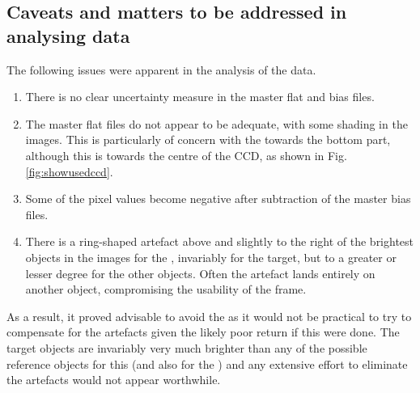 \clearpage

\subsection{Caveats and matters to be addressed in analysing data}
\protect\label{section:mattersaddressed}

The following issues were apparent in the analysis of the data.

\begin{enumerate}
  \item There is no clear uncertainty measure in the master flat and bias files.
  \item The master flat files do not appear to be adequate, with some shading in
  	the images. This is particularly of concern with the {\gfilter}
  	towards the bottom part, although this is towards the centre of the CCD, as
  	shown in Fig. \ref{fig:showusedccd}.
  \item Some of the pixel values become negative after subtraction of the master
  	bias files.
  \item There is a ring-shaped artefact above and slightly to the right of the
  	brightest objects in the images for the {\zfilter}, invariably for
	the target, but to a greater or lesser degree for the other objects. Often the
	artefact lands entirely on another object, compromising the usability of the
	frame.
\end{enumerate}

As a result, it proved advisable to avoid the {\zfilter} as it would not
be practical to try to compensate for the artefacts given the likely poor return
if this were done. The target {\rdwarf} objects are invariably very much
brighter than any of the possible reference objects for this (and also for the
\ifilter) and any extensive effort to eliminate the artefacts would not appear
worthwhile.
